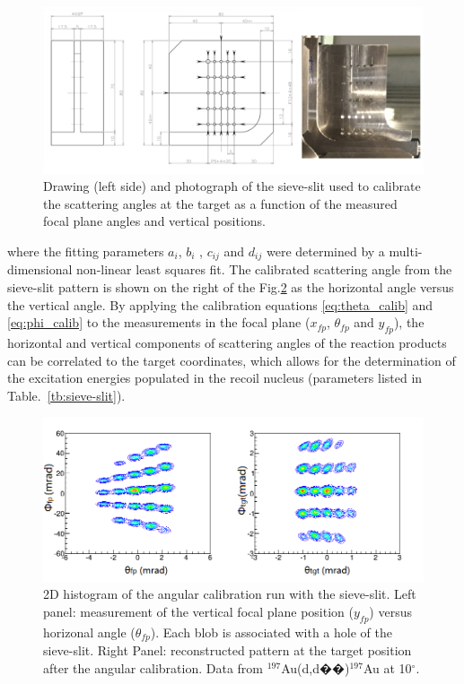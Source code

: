 \begin{figure}[tpb]
  \begin{center}
    \centerline{\includegraphics[scale=0.65]{graph/ch4/sieveslits_1}}
    \caption{Drawing (left side) and photograph of the sieve-slit used to calibrate the scattering angles at the target as a function of the measured focal plane angles and vertical positions.}
    \label{fig:sieve_slits}
  \end{center}
\end{figure}
where the fitting parameters $a_{i}$, $b_{i}$ , $c_{ij}$ and $d_{ij}$ were determined by a multi-dimensional non-linear least squares fit. The calibrated scattering angle from the sieve-slit pattern is shown on the right of the Fig.\ref{fig:anglecalib} as the horizontal angle versus the vertical angle. By applying the calibration equations \ref{eq:theta_calib} and \ref{eq:phi_calib} to the measurements in the focal plane ($x_{fp}$, $\theta_{fp}$ and $y_{fp}$), the horizontal and vertical components of scattering angles of the reaction products can be correlated to the target coordinates, which allows for the determination of the excitation energies populated in the recoil nucleus (parameters listed in Table.~\ref{tb:sieve-slit}).

\begin{figure}[tpb]
  \begin{center}
    \centerline{\includegraphics[scale=0.8]{graph/ch4/angle_cal}}
    \caption{2D histogram of the angular calibration run with the sieve-slit. Left panel: measurement of the vertical focal plane position ($y_{fp}$) versus horizonal angle ($\theta_{fp}$). Each blob is associated with a hole of the sieve-slit. Right Panel: reconstructed pattern at the target position after the angular calibration. Data from $^{197}$Au(d,d��)$^{197}$Au at 10$^{\circ}$.}
    \label{fig:anglecalib}
  \end{center}
\end{figure}



